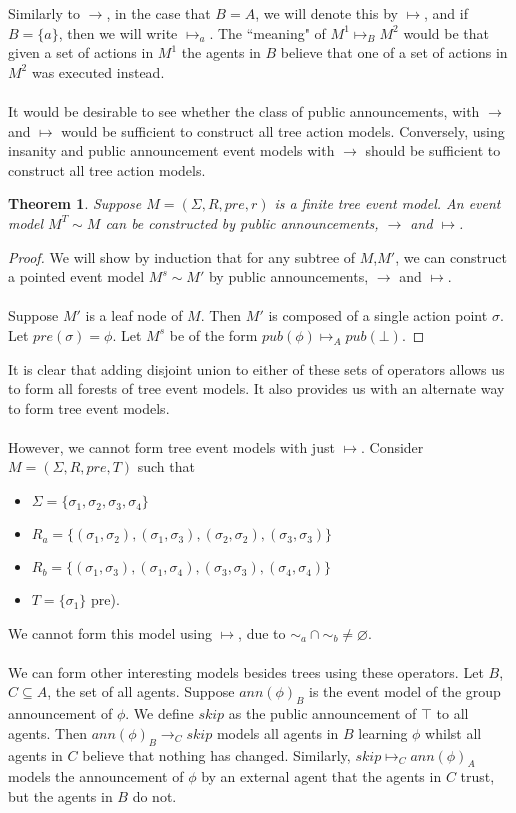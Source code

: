 \documentclass[12pt, a4paper, titlepage]{scrartcl}
\newtheorem{thm}{Theorem}[subsection]
\numberwithin{equation}{section}
\begin{document}
Similarly to $\to$, in the case that $B = A$, we will denote this by $\mapsto$, and if $B = \{a\}$, then
we will write $\mapsto_a$.
The ``meaning" of $M^1 \mapsto_B M^2$ would be that given a set of actions in
$M^1$ the agents in $B$ believe that one of a set of actions in $M^2$ was
executed instead.\\
\\
It would be desirable to see whether the class of public announcements, with
$\to$ and $\mapsto$ would be sufficient to construct all tree action
models.
Conversely, using insanity and public announcement event models with $\to$ should be sufficient to construct
all tree action models.
\begin{thm}
Suppose $M = (\Sigma, R, pre, r)$ is a finite tree event model.
An event model $M^T \sim M$ can be constructed by public announcements, $\to$ and
$\mapsto$.
\end{thm}
\begin{proof}
We will show by induction that for any subtree of $M$,$M'$, we can construct a pointed event model
$M^s \sim M'$ by public announcements, $\to$ and $\mapsto$.\\
\\
Suppose $M'$ is a leaf node of $M$.
Then $M'$ is composed of a single action point $\sigma$.
Let $pre(\sigma) = \phi$.
Let $M^s$ be of the form $pub(\phi) \mapsto_A pub(\bot)$.
\end{proof}
It is clear that adding disjoint union to either of these sets of operators
allows us to form all forests of tree event models.
It also provides us with an alternate way to form tree event models.\\
\\
However, we cannot form tree event models with just $\mapsto$.
Consider $M = (\Sigma, R, pre, T)$ such that
\begin{itemize}
	\item $\Sigma = \{\sigma_1, \sigma_2, \sigma_3, \sigma_4\}$
	\item $R_a =
\{(\sigma_1,\sigma_2),(\sigma_1,\sigma_3),(\sigma_2,\sigma_2),(\sigma_3,\sigma_3)\}$
	\item $R_b = \{(\sigma_1,\sigma_3),(\sigma_1,\sigma_4),(\sigma_3,\sigma_3),(\sigma_4,\sigma_4)\}$
	\item $T = \{ \sigma_1 \}$
pre).
\end{itemize}
We cannot form this model using $ \mapsto $, due to $\sim_a \cap \sim_b \neq
\varnothing$.\\
\\
We can form other interesting models besides trees using these operators.
Let $B$, $C \subseteq A$, the set of all agents.
Suppose $ann(\phi)_B$ is the event model of the group announcement of $\phi$.
We define $skip$ as the public announcement of $\top$ to all agents.
Then $ann(\phi)_B \to_C skip$ models all agents in $B$ learning $\phi$ whilst all agents in $C$
believe that nothing has changed.
Similarly, $skip \mapsto_C ann(\phi)_A$ models the announcement of $\phi$ by an external agent that
the agents in $C$ trust, but the agents in $B$ do not.\\
\\
\end{document}

